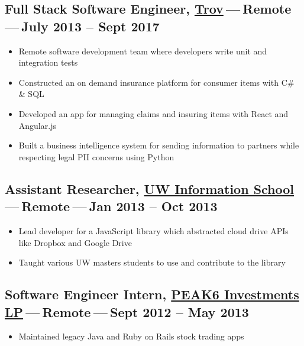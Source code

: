 \documentclass[11pt]{amsart}
\begin{document}
\hypertarget{x-full-stack-software-engineer,-\href{https://www.trov.com/}{trov} — remote — july-2013-–-sept-2017}{\subsection*{Full Stack Software Engineer, \href{https://www.trov.com/}{Trov} — Remote — July 2013 – Sept 2017}}
\begin{itemize}

\item Remote software development team where developers write unit and integration tests

\item Constructed an on demand insurance platform for consumer items with C# & SQL

\item Developed an app for managing claims and insuring items with React and Angular.js

\item Built a business intelligence system for sending information to partners while respecting legal PII concerns using Python

\end{itemize}


\hypertarget{x-assistant-researcher,-\href{https://ischool.uw.edu}{uw-information-school} — remote — jan-2013-–-oct-2013}{\subsection*{Assistant Researcher, \href{https://ischool.uw.edu}{UW Information School} — Remote — Jan 2013 – Oct 2013}}
\begin{itemize}

\item Lead developer for a JavaScript library which abstracted cloud drive APIs like Dropbox and Google Drive

\item Taught various UW masters students to use and contribute to the library

\end{itemize}


\hypertarget{x-software-engineer-intern,-\href{https://www.optionshouse.com/}{peak6-investments-lp} — remote — sept-2012-–-may-2013}{\subsection*{Software Engineer Intern, \href{https://www.optionshouse.com/}{PEAK6 Investments LP} — Remote — Sept 2012 – May 2013}}
\begin{itemize}

\item Maintained legacy Java and Ruby on Rails stock trading apps

\end{itemize}
\end{document}

